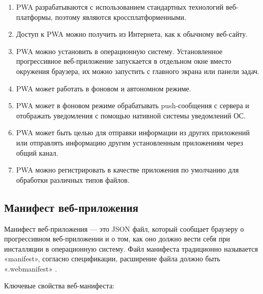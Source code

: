 \begin{enumerate} 
  \item PWA разрабатываются с использованием стандартных технологий веб-платформы, поэтому являются кроссплатформенными.
  
  \item Доступ к PWA можно получить из Интернета, как к обычному веб-сайту.

  \item PWA можно установить в операционную систему. Установленное прогрессивное веб-приложение запускается в отдельном окне вместо окружения браузера, их можно запустить с главного экрана или панели задач.

  \item PWA может работать в фоновом и автономном режиме.

  \item PWA может в фоновом режиме обрабатывать push-сообщения с сервера и отображать уведомления с помощью нативной системы уведомлений ОС.

  \item PWA может быть целью для отправки информации из других приложений или отправлять информацию другим установленным приложениям через общий канал.

  \item PWA можно регистрировать в качестве приложения по умолчанию для обработки различных типов файлов.
\end{enumerate}

\subsection{Манифест веб-приложения}

Манифест веб-приложения — это JSON файл, который сообщает браузеру о прогрессивном веб-приложении и о том, как оно должно вести себя при инсталляции в операционную систему. Файл манифеста традиционно называется «manifest», согласно спецификации, расширение файла должно быть «.webmanifest» \cite{webmanifest}.

Ключевые свойства веб-манифеста:


